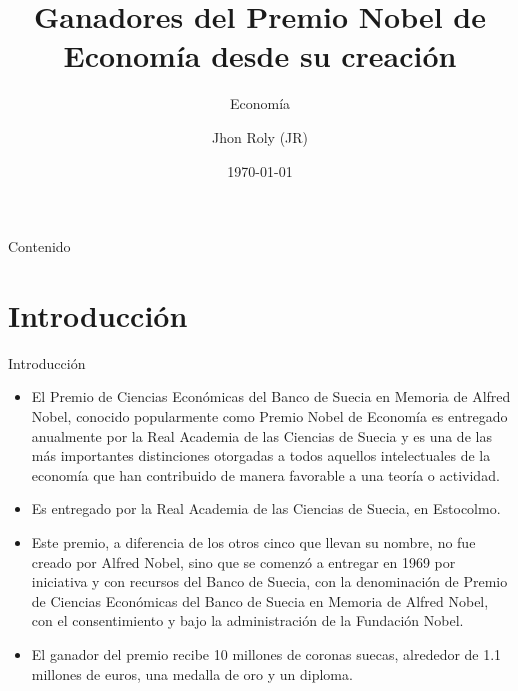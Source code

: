 \documentclass[aspectratio=169]{beamer}
\title{Ganadores del Premio Nobel de Economía desde su creación}
\subtitle{Economía}
\author[JR]{Jhon Roly (JR)}
\institute{
            Universidad Nacional de San Cristóbal de Huamanga\\
            Facultad de Ciencias Económicas, Administrativas y Contables\\
            Escuela Profesional de Economía
        }
\date{\today}
\begin{document}
    \begin{frame}
        \titlepage
    \end{frame}
    \begin{frame}{Contenido}
        \tableofcontents
    \end{frame}
    \section{Introducción}
        \begin{frame}[t]{Introducción}
            \justify
            \begin{itemize}
                \item El Premio de Ciencias Económicas del Banco de Suecia en Memoria
                de Alfred Nobel, conocido popularmente como Premio Nobel de Economía
                es entregado anualmente por la Real Academia de las Ciencias de Suecia 
                y es una de las más importantes distinciones otorgadas a todos aquellos 
                intelectuales de la economía que han contribuido de manera favorable a 
                una teoría o actividad.
                \item Es entregado por la Real Academia de las Ciencias de Suecia, en Estocolmo.
                \item Este premio, a diferencia de los otros cinco que llevan su nombre, no fue 
                creado por Alfred Nobel, sino que se comenzó a entregar en 1969 por iniciativa 
                y con recursos del Banco de Suecia, con la denominación de Premio de Ciencias 
                Económicas del Banco de Suecia en Memoria de Alfred Nobel, con el consentimiento 
                y bajo la administración de la Fundación Nobel.
                \item El ganador del premio recibe 10 millones de coronas suecas, alrededor de 
                1.1 millones de euros, una medalla de oro y un diploma.
            \end{itemize}
        \end{frame}   
\end{document}
